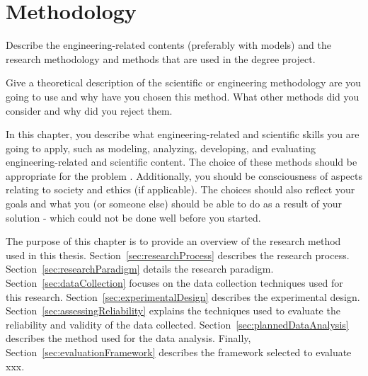 \documentclass[english]{kththesis}
\begin{document}
\chapter{Methodology}
\label{ch:methods}

Describe the engineering-related contents (preferably with models) and the research methodology and methods that are used in the degree project. 

Give a theoretical description of the scientific or engineering methodology are you going to use and why have you chosen this method. What other methods did you consider and why did you reject them.

In this chapter, you describe what engineering-related and scientific skills you are going to apply, such as modeling, analyzing, developing, and evaluating engineering-related and scientific content. The choice of these methods should be appropriate for the problem . Additionally, you should be consciousness of aspects relating to society and ethics (if applicable). The choices should also reflect your goals and what you (or someone else) should be able to do as a result of your solution - which could not be done well before you started.

The purpose of this chapter is to provide an overview of the research method
used in this thesis. Section~\ref{sec:researchProcess} describes the research
process. Section~\ref{sec:researchParadigm} details the research
paradigm. Section~\ref{sec:dataCollection} focuses on the data collection
techniques used for this research. Section~\ref{sec:experimentalDesign}
describes the experimental design. Section~\ref{sec:assessingReliability}
explains the techniques used to evaluate the reliability and validity of the
data collected. Section~\ref{sec:plannedDataAnalysis} describes the method
used for the data analysis. Finally, Section~\ref{sec:evaluationFramework}
describes the framework selected to evaluate xxx.

\end{document}

